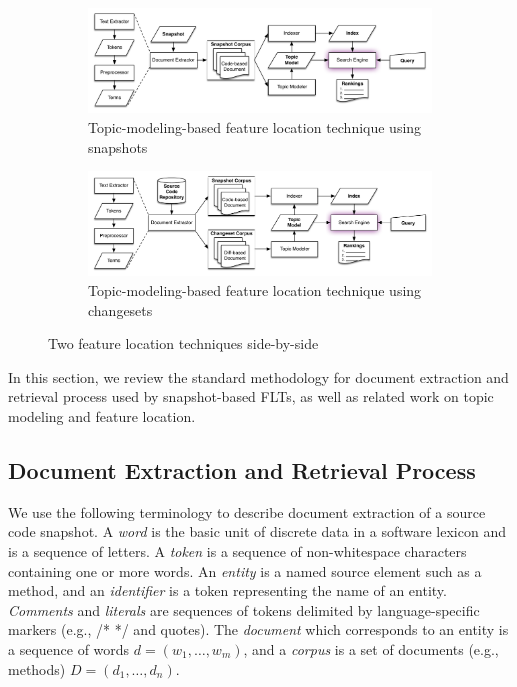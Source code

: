 
\begin{figure}[t]
    \centering
\begin{subfigure}[t]{.9\textwidth}
    \centerline{\includegraphics[width=\textwidth]{figures/snapshot-flt}}
    \caption{Topic-modeling-based feature location technique using snapshots}
    \label{fig:snapshot}
\end{subfigure}

\begin{subfigure}[b]{.9\textwidth}
    \centerline{\includegraphics[width=\textwidth]{figures/changeset-flt}}
\caption{Topic-modeling-based feature location technique using changesets}
\label{fig:changeset}
\end{subfigure}

\label{fig:flts}
\caption{Two feature location techniques side-by-side}
\end{figure}


In this section, we review the standard methodology for document extraction and
retrieval process used by snapshot-based FLTs, as well as related work on topic
modeling and feature location.

\subsection{Document Extraction and Retrieval Process}
\label{sec:snapshot-flt}

We use the following terminology to describe document extraction of a source
code snapshot. A \textit{word} is the basic unit of discrete data in a software
lexicon and is a sequence of letters. A \textit{token} is a sequence of
non-whitespace characters containing one or more words. An \textit{entity} is a
named source element such as a method, and an \textit{identifier} is a token
representing the name of an entity. \textit{Comments} and \textit{literals} are
sequences of tokens delimited by language-specific markers (e.g., /* */ and
quotes). The \textit{document} which corresponds to an entity is a sequence of
words $d = (w_1, \ldots, w_m)$, and a \textit{corpus} is a set of documents
(e.g., methods) $D = (d_1, \ldots, d_n)$.

